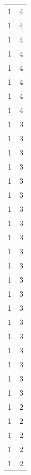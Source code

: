 \begin{tabular}{rr}
                  1 &             4 \\
                  1 &             4 \\
                  1 &             4 \\
                  1 &             4 \\
                  1 &             4 \\
                  1 &             4 \\
                  1 &             4 \\
                  1 &             4 \\
                  1 &             3 \\
                  1 &             3 \\
                  1 &             3 \\
                  1 &             3 \\
                  1 &             3 \\
                  1 &             3 \\
                  1 &             3 \\
                  1 &             3 \\
                  1 &             3 \\
                  1 &             3 \\
                  1 &             3 \\
                  1 &             3 \\
                  1 &             3 \\
                  1 &             3 \\
                  1 &             3 \\
                  1 &             3 \\
                  1 &             3 \\
                  1 &             3 \\
                  1 &             3 \\
                  1 &             3 \\
                  1 &             2 \\
                  1 &             2 \\
                  1 &             2 \\
                  1 &             2 \\
                  1 &             2 \\

\end{tabular}
